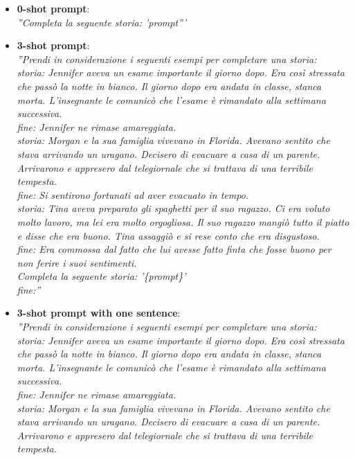 \begin{itemize}
    \item \textbf{0-shot prompt}: \\ \emph{''Completa la seguente storia: '{prompt}'''}
    \item \textbf{3-shot prompt}: \\ \emph{''Prendi in considerazione i seguenti esempi per completare una storia:\\
                storia: Jennifer aveva un esame importante il giorno dopo.	Era così stressata che passò la notte in bianco.	Il giorno dopo era andata in classe, stanca morta.	L'insegnante le comunicò che l'esame è rimandato alla settimana successiva.\\
                fine: Jennifer ne rimase amareggiata.\\
                storia: Morgan e la sua famiglia vivevano in Florida.	Avevano sentito che stava arrivando un uragano.	Decisero di evacuare a casa di un parente.	Arrivarono e appresero dal telegiornale che si trattava di una terribile tempesta.\\
                fine: Si sentirono fortunati ad aver evacuato in tempo.\\
                storia: Tina aveva preparato gli spaghetti per il suo ragazzo.	Ci era voluto molto lavoro, ma lei era molto orgogliosa.	Il suo ragazzo mangiò tutto il piatto e disse che era buono.	Tina assaggiò e si rese conto che era disgustoso.\\
                fine: Era commossa dal fatto che lui avesse fatto finta che fosse buono per non ferire i suoi sentimenti.\\
                Completa la seguente storia: '\{prompt\}'\\
                fine:''}
    \item \textbf{3-shot prompt with one sentence}: \\ \emph{''Prendi in considerazione i seguenti esempi per completare una storia:\\
                storia: Jennifer aveva un esame importante il giorno dopo.	Era così stressata che passò la notte in bianco.	Il giorno dopo era andata in classe, stanca morta.	L'insegnante le comunicò che l'esame è rimandato alla settimana successiva.\\
                fine: Jennifer ne rimase amareggiata.\\
                storia: Morgan e la sua famiglia vivevano in Florida.	Avevano sentito che stava arrivando un uragano.	Decisero di evacuare a casa di un parente.	Arrivarono e appresero dal telegiornale che si trattava di una terribile tempesta.\\
}
\end{itemize}
